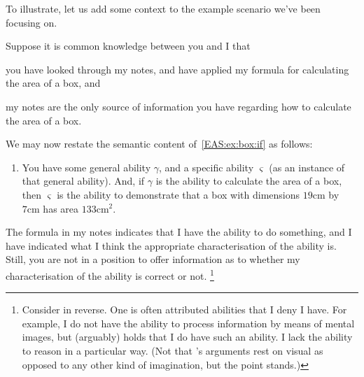 \begin{note}
  To illustrate, let us add some context to the example scenario we've been focusing on.

  Suppose it is common knowledge between you and I that
  \begin{enumerate*}
  \item you have looked through my notes, and have applied my formula for calculating the area of a box, and
  \item my notes are the only source of information you have regarding how to calculate the area of a box.
  \end{enumerate*}
  We may now restate the semantic content of~\ref{EAS:ex:box:if} as follows:
  \begin{enumerate}[label=\emph{A}\arabic*., ref=(\emph{A}\arabic*), resume*=EAS_counter]
  \item\label{EAS:ex:box:inf:R} You have some general ability \(\gamma\), and a specific ability \(\varsigma\) (as an instance of that general ability).
    And, if \(\gamma\) is the ability to calculate the area of a box, then \(\varsigma\) is the ability to demonstrate that a box with dimensions \(19\text{cm}\) by \(7\text{cm}\) has area \(133\text{cm}^{2}\).
  \end{enumerate}
  The formula in my notes indicates that I have the ability to do something, and I have indicated what I think the appropriate characterisation of the ability is.
  Still, you are not in a position to offer information as to whether my characterisation of the ability is correct or not.\nolinebreak
  \footnote{
    Consider in reverse.
    One is often attributed abilities that I deny I have.
    For example, I do not have the ability to process information by means of mental images, but \citeauthor{Hume:2011aa} (arguably) holds that I do have such an ability.
    I lack the ability to reason in a particular way.
    (Not that \citeauthor{Hume:2011aa}'s arguments rest on visual as opposed to any other kind of imagination, but the point stands.)

}
\end{note}
